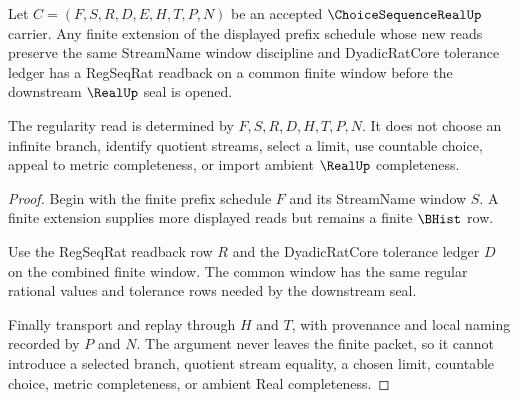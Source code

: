 \begin{theorem}
\label{thm:choice-sequence-real-finite-prefix-regularity}
Let $C=(F,S,R,D,E,H,T,P,N)$ be an accepted $\ChoiceSequenceRealUp$ carrier. Any finite extension of the displayed prefix schedule whose new reads preserve the same StreamName window discipline and DyadicRatCore tolerance ledger has a RegSeqRat readback on a common finite window before the downstream $\RealUp$ seal is opened.

The regularity read is determined by $F,S,R,D,H,T,P,N$. It does not choose an infinite branch, identify quotient streams, select a limit, use countable choice, appeal to metric completeness, or import ambient $\RealUp$ completeness.
\end{theorem}
\begin{proof}
Begin with the finite prefix schedule $F$ and its StreamName window $S$. A finite extension supplies more displayed reads but remains a finite $\BHist$ row.

Use the RegSeqRat readback row $R$ and the DyadicRatCore tolerance ledger $D$ on the combined finite window. The common window has the same regular rational values and tolerance rows needed by the downstream seal.

Finally transport and replay through $H$ and $T$, with provenance and local naming recorded by $P$ and $N$. The argument never leaves the finite packet, so it cannot introduce a selected branch, quotient stream equality, a chosen limit, countable choice, metric completeness, or ambient Real completeness.
\end{proof}


